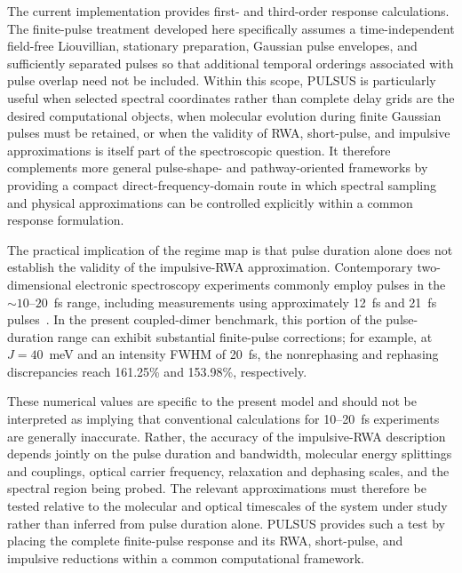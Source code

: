 The current implementation provides first- and third-order response
calculations. The finite-pulse treatment developed here specifically
assumes a time-independent field-free Liouvillian, stationary
preparation, Gaussian pulse envelopes, and sufficiently separated pulses
so that additional temporal orderings associated with pulse overlap need
not be included. Within this
scope, PULSUS is particularly useful when selected spectral coordinates
rather than complete delay grids are the desired computational objects,
when molecular evolution during finite Gaussian pulses must be retained,
or when the validity of RWA, short-pulse, and impulsive approximations
is itself part of the spectroscopic question. It therefore complements
more general pulse-shape- and pathway-oriented frameworks by providing
a compact direct-frequency-domain route in which spectral sampling and
physical approximations can be controlled explicitly within a common
response formulation.

The practical implication of the regime map is that pulse duration
alone does not establish the validity of the impulsive-RWA
approximation. Contemporary two-dimensional electronic spectroscopy
experiments commonly employ pulses in the $\sim 10$--$20$~fs range,
including measurements using approximately 12~fs and 21~fs
pulses~\cite{Timmer2023Plasmon,RojasGatjens2023ManyExciton}.
In the present coupled-dimer benchmark, this portion of the
pulse-duration range can exhibit substantial finite-pulse corrections;
for example, at $J=40$~meV and an intensity FWHM of 20~fs, the
nonrephasing and rephasing discrepancies reach 161.25\% and 153.98\%,
respectively.

These numerical values are specific to the present model and should
not be interpreted as implying that conventional calculations for
10--20~fs experiments are generally inaccurate. Rather, the accuracy
of the impulsive-RWA description depends jointly on the pulse duration
and bandwidth, molecular energy splittings and couplings, optical
carrier frequency, relaxation and dephasing scales, and the spectral
region being probed. The relevant approximations must therefore be
tested relative to the molecular and optical timescales of the system
under study rather than inferred from pulse duration alone. PULSUS
provides such a test by placing the complete finite-pulse response and
its RWA, short-pulse, and impulsive reductions within a common
computational framework.